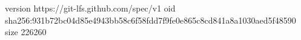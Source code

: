 version https://git-lfs.github.com/spec/v1
oid sha256:931b72bc04d85e4943bb58c6f58fdd7f9fe0e865c8cd841a8a1030aed5f48590
size 226260
